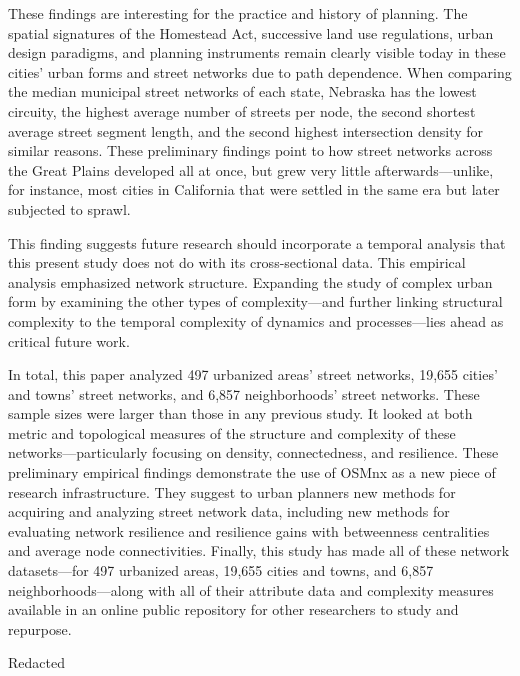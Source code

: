 \documentclass[Afour,sageh,times]{sage/sagej}
\begin{document}
These findings are interesting for the practice and history of planning. The spatial signatures of the Homestead Act, successive land use regulations, urban design paradigms, and planning instruments remain clearly visible today in these cities' urban forms and street networks due to path dependence. When comparing the median municipal street networks of each state, Nebraska has the lowest circuity, the highest average number of streets per node, the second shortest average street segment length, and the second highest intersection density for similar reasons. These preliminary findings point to how street networks across the Great Plains developed all at once, but grew very little afterwards---unlike, for instance, most cities in California that were settled in the same era but later subjected to sprawl. 

This finding suggests future research should incorporate a temporal analysis that this present study does not do with its cross-sectional data. This empirical analysis emphasized network structure. Expanding the study of complex urban form by examining the other types of complexity---and further linking structural complexity to the temporal complexity of dynamics and processes---lies ahead as critical future work. 

In total, this paper analyzed 497 urbanized areas' street networks, 19,655 cities' and towns' street networks, and 6,857 neighborhoods' street networks. These sample sizes were larger than those in any previous study. It looked at both metric and topological measures of the structure and complexity of these networks---particularly focusing on density, connectedness, and resilience. These preliminary empirical findings demonstrate the use of OSMnx as a new piece of research infrastructure. They suggest to urban planners new methods for acquiring and analyzing street network data, including new methods for evaluating network resilience and resilience gains with betweenness centralities and average node connectivities. Finally, this study has made all of these network datasets---for 497 urbanized areas, 19,655 cities and towns, and 6,857 neighborhoods---along with all of their attribute data and complexity measures available in an online public repository for other researchers to study and repurpose.

\begin{acks}
Redacted
\end{acks}


\end{document}

